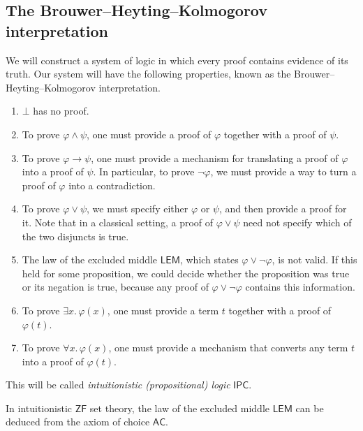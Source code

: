 \subsection{The Brouwer--Heyting--Kolmogorov interpretation}
We will construct a system of logic in which every proof contains evidence of its truth.
Our system will have the following properties, known as the Brouwer--Heyting--Kolmogorov interpretation.
\begin{enumerate}
    \item \( \bot \) has no proof.
    \item To prove \( \varphi \wedge \psi \), one must provide a proof of \( \varphi \) together with a proof of \( \psi \).
    \item To prove \( \varphi \to \psi \), one must provide a mechanism for translating a proof of \( \varphi \) into a proof of \( \psi \).
    In particular, to prove \( \neg\varphi \), we must provide a way to turn a proof of \( \varphi \) into a contradiction.
    \item To prove \( \varphi \vee \psi \), we must specify either \( \varphi \) or \( \psi \), and then provide a proof for it.
    Note that in a classical setting, a proof of \( \varphi \vee \psi \) need not specify which of the two disjuncts is true.
    \item The law of the excluded middle \( \mathsf{LEM} \), which states \( \varphi \vee \neg \varphi \), is not valid.
    If this held for some proposition, we could decide whether the proposition was true or its negation is true, because any proof of \( \varphi \vee \neg \varphi \) contains this information.
    \item To prove \( \exists x.\, \varphi(x) \), one must provide a term \( t \) together with a proof of \( \varphi(t) \).
    \item To prove \( \forall x.\, \varphi(x) \), one must provide a mechanism that converts any term \( t \) into a proof of \( \varphi(t) \).
\end{enumerate}
This will be called \emph{intuitionistic (propositional) logic} \( \mathsf{IPC} \).
\begin{theorem}[Diaconescu]
    In intuitionistic \( \mathsf{ZF} \) set theory, the law of the excluded middle \( \mathsf{LEM} \) can be deduced from the axiom of choice \( \mathsf{AC} \).
\end{theorem}
